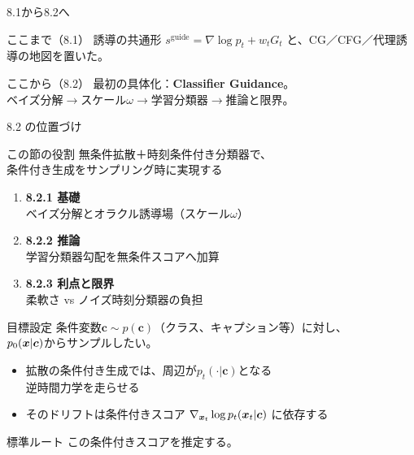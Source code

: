 

\begin{frame}{8.1から8.2へ}
    \begin{block}{ここまで（8.1）}
        誘導の共通形
        $s^{\mathrm{guide}}=\nabla\log p_t+w_t G_t$
        と、CG／CFG／代理誘導の地図を置いた。
    \end{block}
    \begin{block}{ここから（8.2）}
        最初の具体化：\textbf{Classifier Guidance}。\\
        ベイズ分解$\to$スケール$\omega\to$学習分類器$\to$推論と限界。
    \end{block}
\end{frame}
\asmain
\begin{frame}{8.2 の位置づけ}
    \begin{block}{この節の役割}
        無条件拡散＋時刻条件付き分類器で、\\
        条件付き生成をサンプリング時に実現する
    \end{block}
    \begin{enumerate}
        \item \textbf{8.2.1 基礎}\\
        ベイズ分解とオラクル誘導場（スケール$\omega$）
        \item \textbf{8.2.2 推論}\\
        学習分類器勾配を無条件スコアへ加算
        \item \textbf{8.2.3 利点と限界}\\
        柔軟さ vs ノイズ時刻分類器の負担
    \end{enumerate}
\end{frame}
\asmain
\begin{frame}{目標設定}
    条件変数$\bm{c}\sim p(\bm{c})$（クラス、キャプション等）に対し、\\
    $p_0(\bm{x}|\bm{c})$からサンプルしたい。
    \begin{itemize}
        \item 拡散の条件付き生成では、周辺が$p_t(\cdot|\bm{c})$となる\\
        逆時間力学を走らせる
        \item そのドリフトは条件付きスコア
        $\nabla_{\bm{x}_t}\log p_t(\bm{x}_t|\bm{c})$
        に依存する
    \end{itemize}
    \begin{exampleblock}{標準ルート}
        この条件付きスコアを推定する。
    \end{exampleblock}
\end{frame}
